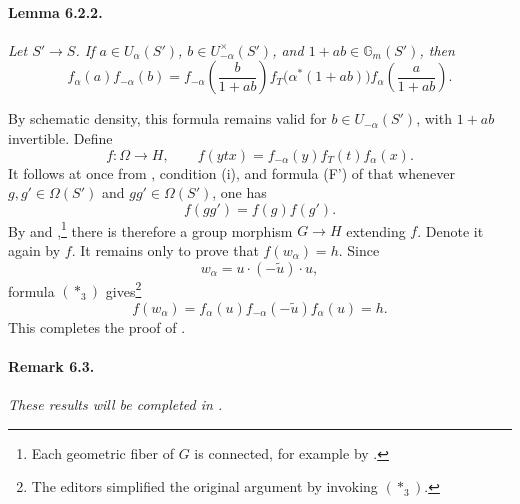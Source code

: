 \paragraph{\textbf{Lemma 6.2.2.}}
\emph{Let \(S'\to S\).  If
\(a\in U_\alpha(S')\), \(b\in U_{-\alpha}^\times(S')\), and
\(1+ab\in\mathbb G_m(S')\), then}
\[
 f_\alpha(a)f_{-\alpha}(b)
 =
 f_{-\alpha}\!\left(\frac{b}{1+ab}\right)
 f_T\bigl(\alpha^\ast(1+ab)\bigr)
 f_\alpha\!\left(\frac{a}{1+ab}\right).
\]

By schematic density, this formula remains valid for
\(b\in U_{-\alpha}(S')\), with \(1+ab\) invertible.  Define
\[
 f\colon\Omega\longrightarrow H,
 \qquad
 f(ytx)=f_{-\alpha}(y)f_T(t)f_\alpha(x).
\]
It follows at once from , condition \textup{(i)}, and
formula \textup{(F')} of  that whenever
\(g,g'\in\Omega(S')\) and \(gg'\in\Omega(S')\), one has
\[
 f(gg')=f(g)f(g').
\]
By \textup{} and ,\footnote{Each geometric
fiber of \(G\) is connected, for example by .} there is therefore
a group morphism \(G\to H\) extending \(f\).  Denote it again by
\(f\).  It remains only to prove that \(f(w_\alpha)=h\).  Since
\[
 w_\alpha=u\cdot(-\widetilde u)\cdot u,
\]
formula \((\ast_3)\) gives\footnote{The editors simplified the
original argument by invoking \((\ast_3)\).}
\[
 f(w_\alpha)
 =f_\alpha(u)f_{-\alpha}(-\widetilde u)f_\alpha(u)
 =h.
\]
This completes the proof of .

\paragraph{\textbf{Remark 6.3.}}
\emph{These results will be completed in .}




